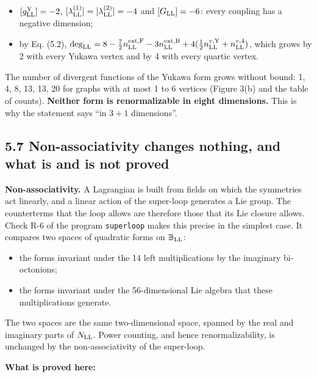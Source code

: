 \documentclass[
  10pt,
]{article}
\providecommand{\tightlist}{%
  \setlength{\itemsep}{0pt}\setlength{\parskip}{0pt}}
\begin{document}
\begin{itemize}
\tightlist
\item
  \([g^{\rm Y}_{\rm LL}]=-2\),
  \([\lambda^{(1)}_{\rm LL}]=[\lambda^{(2)}_{\rm LL}]=-4\) and
  \([G_{\rm LL}]=-6\): every coupling has a negative dimension;
\item
  by Eq. (5.2),
  \(\deg_{\rm LL}=8-\tfrac72n^{\rm ext,F}_{\rm LL}-3n^{\rm ext,B}_{\rm LL}+4(\tfrac12n^{\rm v,Y}_{\rm LL}+n^{\rm v,4}_{\rm LL})\),
  which grows by 2 with every Yukawa vertex and by 4 with every quartic
  vertex.
\end{itemize}

The number of divergent functions of the Yukawa form grows without
bound: 1, 4, 8, 13, 13, 20 for graphs with at most 1 to 6 vertices
(Figure 3(b) and the table of counts). \textbf{Neither form is
renormalizable in eight dimensions.} This is why the statement says ``in
\(3+1\) dimensions''.

\hypertarget{non-associativity-changes-nothing-and-what-is-and-is-not-proved}{%
\subsection{5.7 Non-associativity changes nothing, and what is and is
not
proved}\label{non-associativity-changes-nothing-and-what-is-and-is-not-proved}}

\textbf{Non-associativity.} A Lagrangian is built from fields on which
the symmetries act linearly, and a linear action of the super-loop
generates a Lie group. The counterterms that the loop allows are
therefore those that its Lie closure allows. Check R-6 of the program
\texttt{superloop} makes this precise in the simplest case. It compares
two spaces of quadratic forms on \(\mathbb B_{\rm LL}\):

\begin{itemize}
\tightlist
\item
  the forms invariant under the 14 left multiplications by the imaginary
  bi-octonions;
\item
  the forms invariant under the 56-dimensional Lie algebra that these
  multiplications generate.
\end{itemize}

The two spaces are the same two-dimensional space, spanned by the real
and imaginary parts of \(N_{\rm LL}\). Power counting, and hence
renormalizability, is unchanged by the non-associativity of the
super-loop.

\textbf{What is proved here:}
\end{document}
